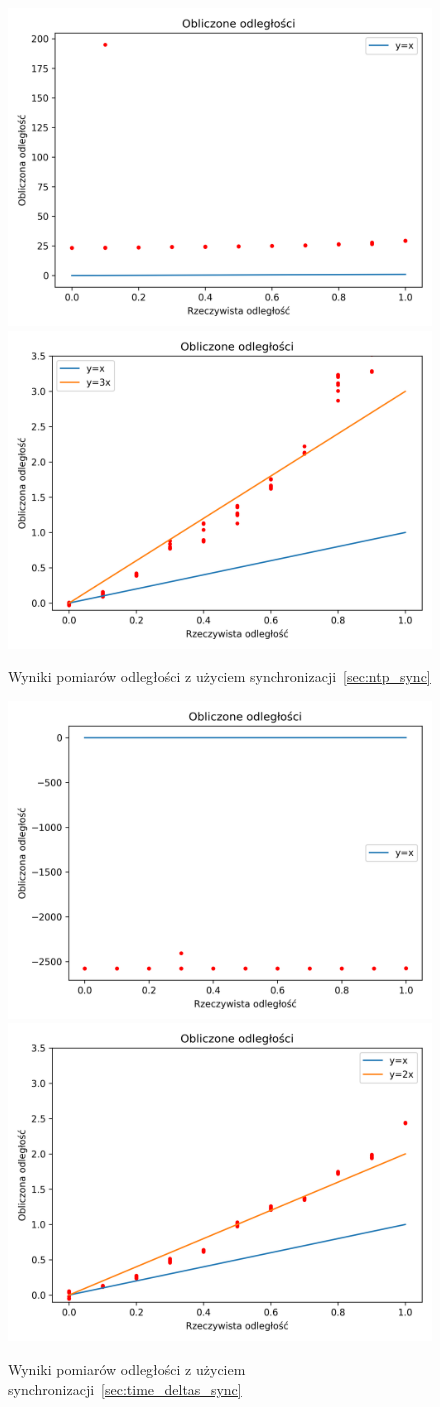 \begin{figure}[h]
\centering
    \includegraphics[width=.49\textwidth]{pics/ntp_sync_dist/dists.png}
    \includegraphics[width=.49\textwidth]{pics/ntp_sync_dist/dists_close.png}
\caption{Wyniki pomiarów odległości z użyciem synchronizacji~\ref{sec:ntp_sync}}
\label{pic:ntp_sync_dist}
\end{figure}

\begin{figure}[h]
\centering
    \includegraphics[width=.49\textwidth]{pics/time_deltas_dist/dists.png}
    \includegraphics[width=.49\textwidth]{pics/time_deltas_dist/dists_close.png}
\caption{Wyniki pomiarów odległości z użyciem synchronizacji~\ref{sec:time_deltas_sync}}
\label{pic:time_deltas_dist}
\end{figure}

